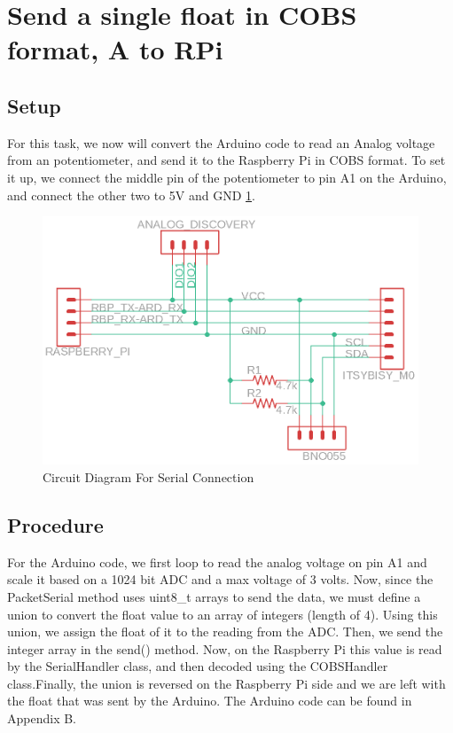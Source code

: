 \documentclass{article}
\begin{document}
	\section{Send a single float in COBS format, A to RPi}
	\subsection{Setup}
	For this task, we now will convert the Arduino code to read an Analog voltage from an potentiometer, and send it to the Raspberry Pi in COBS format. To set it up, we connect the middle pin of the potentiometer to pin A1 on the Arduino, and connect the other two to 5V and GND \ref{CNN3}.
	\begin{figure}[hb]
		\includegraphics[width=\textwidth]{img/Lab3_SerialConnection.png}
		\caption{Circuit Diagram For Serial Connection} 
		\label{CNN3}
	\end{figure}
	
	\subsection{Procedure}
	For the Arduino code, we first loop to read the analog voltage on pin A1 and scale it based on a 1024 bit ADC and a max voltage of 3 volts. Now, since the PacketSerial method uses uint8\_t arrays to send the data, we must define a union to convert the float value to an array of integers (length of 4). Using this union, we assign the float of it to the reading from the ADC. Then, we send the integer array in the send() method. Now, on the Raspberry Pi this value is read by the SerialHandler class, and then decoded using the COBSHandler class.Finally, the union is reversed on the Raspberry Pi side and we are left with the float that was sent by the Arduino. The Arduino code can be found in Appendix B.
	
\end{document}
